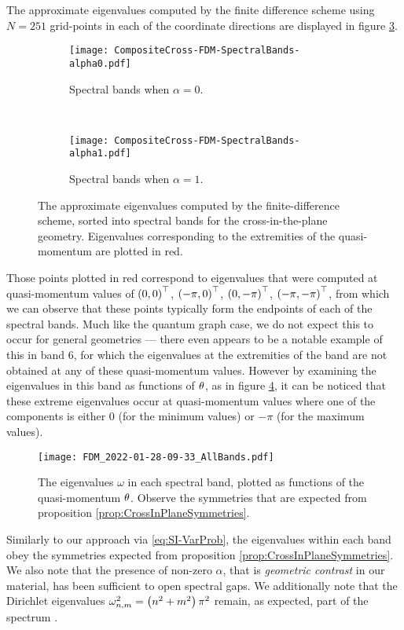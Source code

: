 The approximate eigenvalues computed by the finite difference scheme using $N=251$ grid-points in each of the coordinate directions are displayed in figure \ref{fig:CompositeCross-FDM-SpectralBands}.
\begin{figure}[b!]
	\centering
	\begin{subfigure}[t]{0.45\textwidth}
		\centering
		\texttt{[image: CompositeCross-FDM-SpectralBands-alpha0.pdf]}
		\caption[]{\label{fig:CompositeCross-FDM-SpectralBands-alpha0} Spectral bands when $\alpha=0$.}
	\end{subfigure}
	~
	\begin{subfigure}[t]{0.45\textwidth}
		\centering
		\texttt{[image: CompositeCross-FDM-SpectralBands-alpha1.pdf]}
		\caption[]{\label{fig:CompositeCross-FDM-SpectralBands-alpha1} Spectral bands when $\alpha=1$.}
	\end{subfigure}
	\caption{\label{fig:CompositeCross-FDM-SpectralBands} The approximate eigenvalues computed by the finite-difference scheme, sorted into spectral bands for the cross-in-the-plane geometry. Eigenvalues corresponding to the extremities of the quasi-momentum are plotted in red.}
\end{figure}
Those points plotted in red correspond to eigenvalues that were computed at quasi-momentum values of $\left( 0,0 \right)^\top$, $\left( -\pi,0 \right)^\top$, $\left( 0,-\pi \right)^\top$, $\left( -\pi,-\pi \right)^\top$, from which we can observe that these points typically form the endpoints of each of the spectral bands.
Much like the quantum graph case, we do not expect this to occur for general geometries --- there even appears to be a notable example of this in band 6, for which the eigenvalues at the extremities of the band are not obtained at any of these quasi-momentum values.
However by examining the eigenvalues in this band as functions of $\theta$, as in figure \ref{fig:FDM_2022-01-28-09-33_AllBands}, it can be noticed that these extreme eigenvalues occur at quasi-momentum values where one of the components is either 0 (for the minimum values) or $-\pi$ (for the maximum values). 
\begin{figure}[b!]
	\centering
	\texttt{[image: FDM\_2022-01-28-09-33\_AllBands.pdf]}
	\caption{\label{fig:FDM_2022-01-28-09-33_AllBands} The eigenvalues $\omega$ in each spectral band, plotted as functions of the quasi-momentum $\theta$. Observe the symmetries that are expected from proposition \ref{prop:CrossInPlaneSymmetries}.}
\end{figure}
Similarly to our approach via \eqref{eq:SI-VarProb}, the eigenvalues within each band obey the symmetries expected from proposition \ref{prop:CrossInPlaneSymmetries}.
We also note that the presence of non-zero $\alpha$, that is \emph{geometric contrast} in our material, has been sufficient to open spectral gaps.
We additionally note that the Dirichlet eigenvalues $\omega_{n,m}^2=\left( n^2+m^2 \right)\pi^2$ remain, as expected, part of the spectrum .

